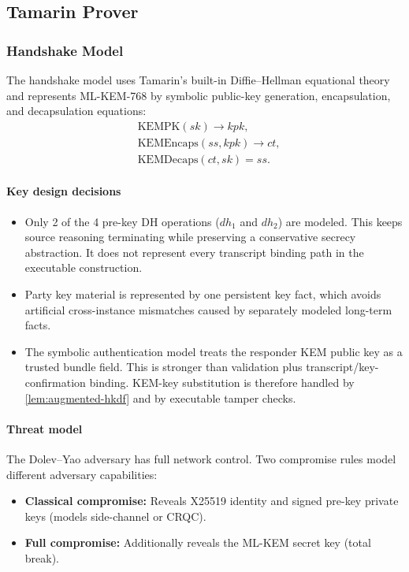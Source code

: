 \documentclass[preprint,12pt]{elsarticle}
\theoremstyle{definition}
\begin{document}
\subsection{Tamarin Prover}\label{sec:tamarin}

\subsubsection{Handshake Model}

The handshake model uses Tamarin's built-in Diffie--Hellman equational theory
and represents ML-KEM-768 by symbolic public-key generation, encapsulation, and
decapsulation equations:
\begin{align}
  &\mathrm{KEMPK}(sk) \to kpk, \label{eq:tamarin-kyber-pk}\\
  &\mathrm{KEMEncaps}(ss, kpk) \to ct, \label{eq:tamarin-kyber-encaps}\\
  &\mathrm{KEMDecaps}(ct, sk) = ss. \label{eq:tamarin-kyber-decaps}
\end{align}

\paragraph{Key design decisions}
\begin{itemize}
  \item Only 2 of the 4 pre-key DH operations ($\mathit{dh}_1$ and $\mathit{dh}_2$)
  are modeled. This keeps source reasoning terminating while preserving a
  conservative secrecy abstraction. It does not represent every transcript
  binding path in the executable construction.

  \item Party key material is represented by one persistent key fact, which
  avoids artificial cross-instance mismatches caused by separately modeled
  long-term facts.
  \item The symbolic authentication model treats the responder KEM public key
  as a trusted bundle field. This is stronger than validation plus
  transcript/key-confirmation binding. KEM-key substitution is therefore
  handled by \cref{lem:augmented-hkdf} and by executable tamper checks.
\end{itemize}

\paragraph{Threat model}
The Dolev--Yao adversary has full network control. Two compromise rules model different adversary capabilities:
\begin{itemize}
  \item \textbf{Classical compromise:} Reveals X25519 identity and signed pre-key private keys (models side-channel or CRQC).
  \item \textbf{Full compromise:} Additionally reveals the ML-KEM secret key (total break).
\end{itemize}
\end{document}
